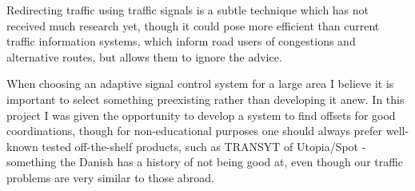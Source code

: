 Redirecting traffic using traffic signals is a subtle technique which has not received much research yet, though it could pose more efficient than current traffic information systems, which inform road users of congestions and alternative routes, but allows them to ignore the advice.

When choosing an adaptive signal control system for a large area I believe it is important to select something preexisting rather than developing it anew. In this project I was given the opportunity to develop a system to find offsets for good coordinations, though for non-educational purposes one should always prefer well-known tested off-the-shelf products, such as TRANSYT of Utopia/Spot - something the Danish has a history of not being good at, even though our traffic problems are very similar to those abroad.
